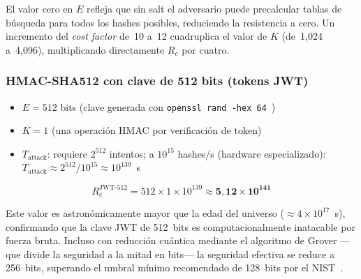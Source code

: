 El valor cero en $E$ refleja que sin salt el adversario puede precalcular tablas de búsqueda para
todos los hashes posibles, reduciendo la resistencia a cero. Un incremento del \textit{cost
factor} de~10 a~12 cuadruplica el valor de $K$ (de~1{,}024 a~4{,}096), multiplicando
directamente $R_c$ por cuatro.

\subsubsection*{HMAC-SHA512 con clave de 512 bits (tokens JWT)}

\begin{itemize}
    \item $E = 512$ bits \quad (clave generada con \texttt{openssl rand -hex 64}~\cite{nistir8413})
    \item $K = 1$ \quad (una operación HMAC por verificación de token)
    \item $T_{\text{attack}}$: requiere $2^{512}$ intentos; a $10^{15}$ hashes/s (hardware
          especializado): $T_{\text{attack}} \approx 2^{512} / 10^{15} \approx 10^{139}$~s
\end{itemize}

\begin{equation}
    R_c^{\text{JWT-512}} = 512 \times 1 \times 10^{139} \approx \mathbf{5{,}12 \times 10^{141}}
    \label{eq:rc_jwt}
\end{equation}

Este valor es astronómicamente mayor que la edad del universo ($\approx 4 \times 10^{17}$~s),
confirmando que la clave JWT de 512~bits es computacionalmente inatacable por fuerza bruta.
Incluso con reducción cuántica mediante el algoritmo de Grover ---que divide la seguridad a la
mitad en bits--- la seguridad efectiva se reduce a 256~bits, superando el umbral mínimo
recomendado de 128~bits por el NIST~\cite{nistir8413}.
